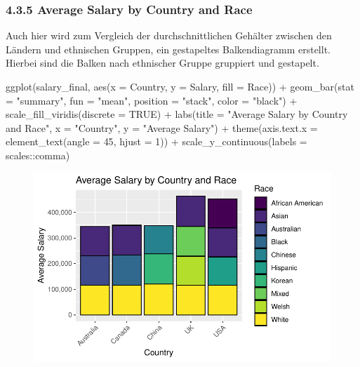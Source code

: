 \documentclass[
  letterpaper,
  DIV=11,
  numbers=noendperiod]{scrartcl}
\newenvironment{Shaded}{\begin{snugshade}}{\end{snugshade}}
\newcommand{\AttributeTok}[1]{\textcolor[rgb]{0.40,0.45,0.13}{#1}}
\newcommand{\ConstantTok}[1]{\textcolor[rgb]{0.56,0.35,0.01}{#1}}
\newcommand{\DecValTok}[1]{\textcolor[rgb]{0.68,0.00,0.00}{#1}}
\newcommand{\FunctionTok}[1]{\textcolor[rgb]{0.28,0.35,0.67}{#1}}
\newcommand{\NormalTok}[1]{\textcolor[rgb]{0.00,0.23,0.31}{#1}}
\newcommand{\SpecialCharTok}[1]{\textcolor[rgb]{0.37,0.37,0.37}{#1}}
\newcommand{\StringTok}[1]{\textcolor[rgb]{0.13,0.47,0.30}{#1}}
\begin{document}
\hypertarget{average-salary-by-country-and-race}{%
\subsubsection{4.3.5 Average Salary by Country and
Race}\label{average-salary-by-country-and-race}}

Auch hier wird zum Vergleich der durchschnittlichen Gehälter zwischen
den Ländern und ethnischen Gruppen, ein gestapeltes Balkendiagramm
erstellt. Hierbei sind die Balken nach ethnischer Gruppe gruppiert und
gestapelt.

\begin{Shaded}
\begin{Highlighting}[]
\FunctionTok{ggplot}\NormalTok{(salary\_final, }\FunctionTok{aes}\NormalTok{(}\AttributeTok{x =}\NormalTok{ Country, }\AttributeTok{y =}\NormalTok{ Salary, }\AttributeTok{fill =}\NormalTok{ Race)) }\SpecialCharTok{+}
  \FunctionTok{geom\_bar}\NormalTok{(}\AttributeTok{stat =} \StringTok{"summary"}\NormalTok{, }\AttributeTok{fun =} \StringTok{"mean"}\NormalTok{, }\AttributeTok{position =} \StringTok{"stack"}\NormalTok{, }\AttributeTok{color =} \StringTok{"black"}\NormalTok{) }\SpecialCharTok{+}
  \FunctionTok{scale\_fill\_viridis}\NormalTok{(}\AttributeTok{discrete =} \ConstantTok{TRUE}\NormalTok{) }\SpecialCharTok{+}
  \FunctionTok{labs}\NormalTok{(}\AttributeTok{title =} \StringTok{"Average Salary by Country and Race"}\NormalTok{,}
       \AttributeTok{x =} \StringTok{"Country"}\NormalTok{,}
       \AttributeTok{y =} \StringTok{"Average Salary"}\NormalTok{) }\SpecialCharTok{+}
  \FunctionTok{theme}\NormalTok{(}\AttributeTok{axis.text.x =} \FunctionTok{element\_text}\NormalTok{(}\AttributeTok{angle =} \DecValTok{45}\NormalTok{, }\AttributeTok{hjust =} \DecValTok{1}\NormalTok{)) }\SpecialCharTok{+}
  \FunctionTok{scale\_y\_continuous}\NormalTok{(}\AttributeTok{labels =}\NormalTok{ scales}\SpecialCharTok{::}\NormalTok{comma)}
\end{Highlighting}
\end{Shaded}

\begin{figure}[H]

{\centering \includegraphics{main_doc_files/figure-pdf/unnamed-chunk-34-1.pdf}

}

\end{figure}
\end{document}
